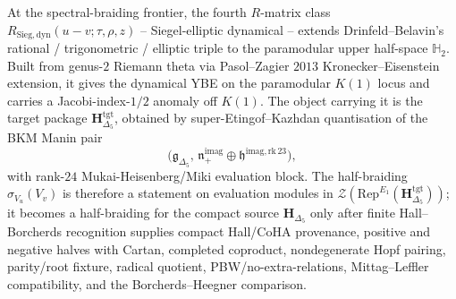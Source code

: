 \begin{remark}
\label{rem:sbf-R-sieg-frontier}
At the spectral-braiding frontier, the fourth $R$-matrix class
$R_{\mathrm{Sieg,dyn}}(u - v; \tau, \rho, z)$ -- Siegel-elliptic
dynamical -- extends Drinfeld--Belavin's rational / trigonometric /
elliptic triple to the paramodular upper half-space $\mathbb{H}_2$.
Built from genus-$2$ Riemann theta via Pasol--Zagier $2013$
Kronecker--Eisenstein extension, it gives the dynamical YBE on the
paramodular $K(1)$ locus and carries a Jacobi-index-$1/2$ anomaly off
$K(1)$. The object carrying it is the target package
$\mathbf H_{\Delta_5}^{\mathrm{tgt}}$, obtained by
super-Etingof--Kazhdan quantisation of the BKM Manin pair
\[
\bigl(\mathfrak g_{\Delta_5},\,
\mathfrak n_+^{\mathrm{imag}}\oplus
\mathfrak h^{\mathrm{imag,rk\,23}}\bigr),
\]
with rank-$24$ Mukai-Heisenberg/Miki evaluation block. The half-braiding
$\sigma_{V_u}(V_v)$ is therefore a statement on evaluation modules in
$\mathcal{Z}(\mathrm{Rep}^{E_1}(\mathbf H_{\Delta_5}^{\mathrm{tgt}}))$;
it becomes a half-braiding for the compact source
$\mathbf H_{\Delta_5}$ only after finite Hall--Borcherds recognition
supplies compact Hall/CoHA provenance, positive and negative halves with
Cartan, completed coproduct, nondegenerate Hopf pairing, parity/root
fixture, radical quotient, PBW/no-extra-relations, Mittag--Leffler
compatibility, and the Borcherds--Heegner comparison.
\end{remark}

